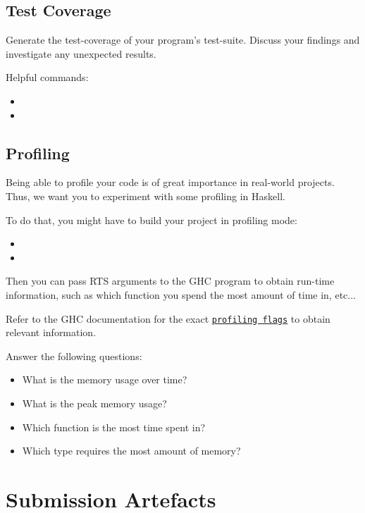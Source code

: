 \documentclass{article}
\begin{document}
\subsection{Test Coverage}

Generate the test-coverage of your program's test-suite.
Discuss your findings and investigate any unexpected results.

Helpful commands:

\begin{itemize}
\item {}
\item {}
\end{itemize}

\subsection{Profiling}

Being able to profile your code is of great importance in real-world projects. Thus, we want you to experiment with some profiling in Haskell.

To do that, you might have to build your project in profiling mode:

\begin{itemize}
\item {}
\item {}
\end{itemize}

Then you can pass RTS arguments to the GHC program to obtain run-time information, such as which function you spend the most amount of time in, etc...

Refer to the GHC documentation for the exact \href{https://downloads.haskell.org/ghc/latest/docs/html/users_guide/profiling.html#profiling-memory-usage}{\texttt{profiling flags}} to obtain relevant information.

Answer the following questions:

\begin{itemize}
\item What is the memory usage over time?
\item What is the peak memory usage?
\item Which function is the most time spent in?
\item Which type requires the most amount of memory?
\end{itemize}

\section{Submission Artefacts}
\label{sec:artefacts}
\end{document}
